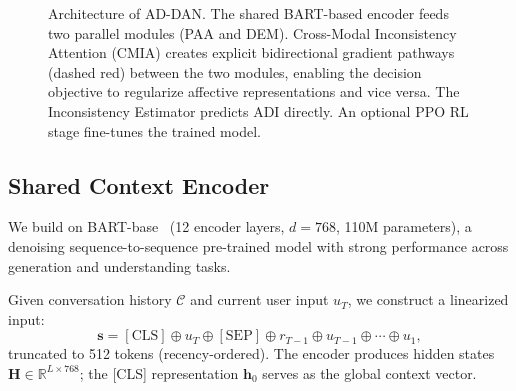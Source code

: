 \documentclass[lettersize,journal]{IEEEtran}
\begin{document}
\begin{figure}[!t]
\caption{Architecture of AD-DAN.  The shared BART-based encoder feeds two
parallel modules (PAA and DEM).  Cross-Modal Inconsistency Attention (CMIA)
creates explicit bidirectional gradient pathways (dashed red) between the two
modules, enabling the decision objective to regularize affective
representations and vice versa.  The Inconsistency Estimator predicts ADI
directly.  An optional PPO RL stage fine-tunes the trained model.}
\label{fig:architecture}
\end{figure}

\subsection{Shared Context Encoder}
We build on BART-base~\cite{lewis2020bart} (12 encoder layers, $d{=}768$,
110M parameters), a denoising sequence-to-sequence pre-trained model with
strong performance across generation and understanding tasks.

Given conversation history $\mathcal{C}$ and current user input $u_T$, we
construct a linearized input:
\begin{equation}
\mathbf{s}
  = [\mathrm{CLS}]\oplus u_T \oplus [\mathrm{SEP}]
    \oplus r_{T-1} \oplus u_{T-1} \oplus \cdots \oplus u_1,
\end{equation}
truncated to 512 tokens (recency-ordered).  The encoder produces hidden
states $\mathbf{H}\in\mathbb{R}^{L\times 768}$; the [CLS] representation
$\mathbf{h}_0$ serves as the global context vector.
\end{document}

